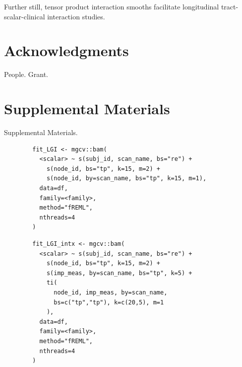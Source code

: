 \documentclass[12pt]{article}
\newcommand{\beginsupplement}{%
	\setcounter{table}{0}
	\renewcommand{\thetable}{S\arabic{table}}%
	\setcounter{figure}{0}
	\renewcommand{\thefigure}{S\arabic{figure}}%
}
\begin{document}
Further still, tensor product interaction smooths facilitate longitudinal tract-scalar-clinical interaction studies.





\section*{Acknowledgments}
\label{sec:ack}
People. Grant.



\pagebreak
\printbibliography
\pagebreak


\section{Supplemental Materials}
\label{sec:supp-materials}
\beginsupplement
Supplemental Materials.


\begin{equ}[H]
	\begin{lstlisting}
		fit_LGI <- mgcv::bam(
		  <scalar> ~ s(subj_id, scan_name, bs="re") +
		    s(node_id, bs="tp", k=15, m=2) +
		    s(node_id, by=scan_name, bs="tp", k=15, m=1),
		  data=df,
		  family=<family>,
		  method="fREML",
		  nthreads=4
		)
	\end{lstlisting}
	\caption{Tract scalars are modeled as a function of tract node with thin-plate regression splines using both global and group (\lstinline{scan_name}) smooths as well as individual group wiggliness. \lstinline{<scalar>} = relevant DWI metric (AD, RD, MD, or FA), \lstinline{scan_name} = session identifier factor (Base, Post, RTP), \lstinline{<family>} = relevant family and link function for scalar distribution.}
	\label{supp-code:gam-lgi}
\end{equ}


\begin{equ}[H]
	\begin{lstlisting}
		fit_LGI_intx <- mgcv::bam(
		  <scalar> ~ s(subj_id, scan_name, bs="re") +
		    s(node_id, bs="tp", k=15, m=2) +
		    s(imp_meas, by=scan_name, bs="tp", k=5) +
		    ti(
		      node_id, imp_meas, by=scan_name,
		      bs=c("tp","tp"), k=c(20,5), m=1
		    ),
		  data=df,
		  family=<family>,
		  method="fREML",
		  nthreads=4
		)
	\end{lstlisting}
	\caption{Tract scalars are modeled as a function of separate 1D node and ImPACT smooths as well as a 2D tensor product interaction surface. \lstinline{imp_meas} = ImPACT composite or total symptom measure.}
	\label{supp-code:gam-lgi-intx}
\end{equ}
\end{document}
